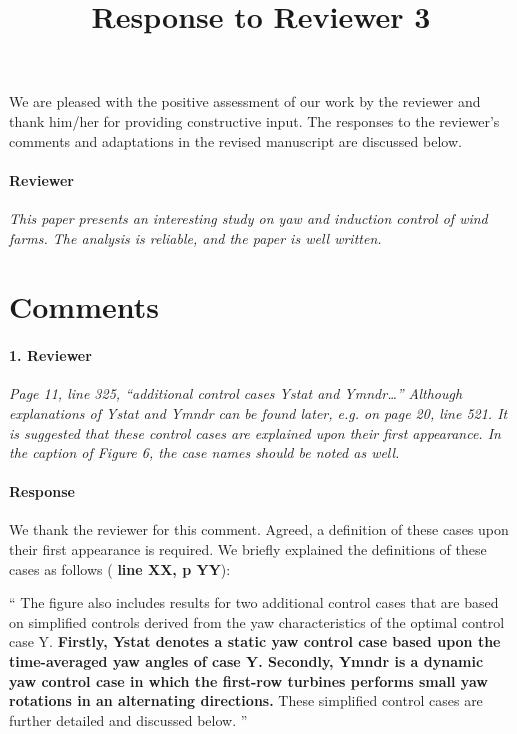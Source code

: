 \documentclass[]{article}
\title{Response to Reviewer 3}
\author{}
\date{}
\newcommand{\red}[1]{\textbf{\color{red} #1}}
\newcommand{\revision}[1]{\textbf{#1}}
\begin{document}
\maketitle

We are pleased with the positive assessment of our work by the reviewer and thank him/her for providing constructive input. The responses to the reviewer's comments and adaptations in the revised manuscript are discussed below.

\hrulefill

\paragraph{Reviewer} \textit{This paper presents an interesting study on yaw and induction control of wind farms. The analysis is reliable, and the paper is well written.}


\section*{Comments}
\hrulefill

\paragraph{1. Reviewer} \textit{Page 11, line 325, “additional control cases Ystat and Ymndr…” Although explanations of Ystat and Ymndr can be found later, e.g. on page 20, line 521. It is suggested that these control cases are explained upon their first appearance. In the caption of Figure 6, the case names should be noted as well.}

\paragraph{Response} We thank the reviewer for this comment. Agreed, a definition of these cases upon their first appearance is required. We briefly explained the definitions of these cases as follows (\red{line XX, p YY}): 

`` 
The figure also includes results for two additional control cases that are based on simplified controls derived from the yaw characteristics of the optimal control case Y. \revision{Firstly, Ystat denotes a static yaw control case based upon the time-averaged yaw angles of case Y. Secondly, Ymndr is a dynamic yaw control case in which the first-row turbines performs small yaw rotations in an alternating directions.} These simplified control cases are further detailed and discussed below.
''
\end{document}
